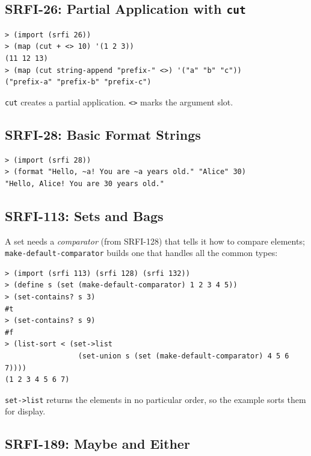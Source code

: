 \subsection{SRFI-26: Partial Application with \texttt{cut}}

\begin{lstlisting}[style=repl]
> (import (srfi 26))
> (map (cut + <> 10) '(1 2 3))
(11 12 13)
> (map (cut string-append "prefix-" <>) '("a" "b" "c"))
("prefix-a" "prefix-b" "prefix-c")
\end{lstlisting}

\texttt{cut} creates a partial application. \texttt{<>} marks the argument slot.

\subsection{SRFI-28: Basic Format Strings}

\begin{lstlisting}[style=repl]
> (import (srfi 28))
> (format "Hello, ~a! You are ~a years old." "Alice" 30)
"Hello, Alice! You are 30 years old."
\end{lstlisting}

\subsection{SRFI-113: Sets and Bags}

A set needs a \emph{comparator} (from SRFI-128) that tells it how to compare elements; \texttt{make-default-comparator} builds one that handles all the common types:

\begin{lstlisting}[style=repl]
> (import (srfi 113) (srfi 128) (srfi 132))
> (define s (set (make-default-comparator) 1 2 3 4 5))
> (set-contains? s 3)
#t
> (set-contains? s 9)
#f
> (list-sort < (set->list
                 (set-union s (set (make-default-comparator) 4 5 6 7))))
(1 2 3 4 5 6 7)
\end{lstlisting}

\texttt{set->list} returns the elements in no particular order, so the example sorts them for display.

\subsection{SRFI-189: Maybe and Either}

